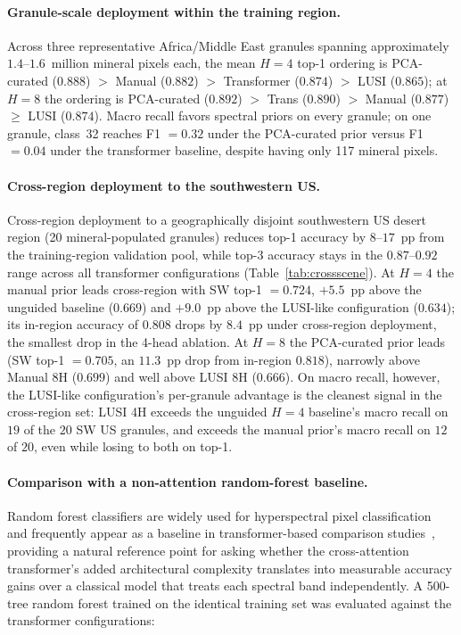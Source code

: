 \documentclass[11pt]{article}
\begin{document}
\paragraph{Granule-scale deployment within the training region.}
Across three representative Africa/Middle East granules spanning approximately $1.4$--$1.6$~million mineral pixels each, the mean $H = 4$ top-1 ordering is PCA-curated ($0.888$) $>$ Manual ($0.882$) $>$ Transformer ($0.874$) $>$ LUSI ($0.865$); at $H = 8$ the ordering is PCA-curated ($0.892$) $>$ Trans ($0.890$) $>$ Manual ($0.877$) $\geq$ LUSI ($0.874$).
Macro recall favors spectral priors on every granule; on one granule, class~32 reaches F1 $= 0.32$ under the PCA-curated prior versus F1 $= 0.04$ under the transformer baseline, despite having only 117 mineral pixels.

\paragraph{Cross-region deployment to the southwestern US.}
Cross-region deployment to a geographically disjoint southwestern US desert region (20 mineral-populated granules) reduces top-1 accuracy by $8$--$17$~pp from the training-region validation pool, while top-3 accuracy stays in the $0.87$--$0.92$ range across all transformer configurations (Table~\ref{tab:crossscene}).
At $H = 4$ the manual prior leads cross-region with SW top-1 $= 0.724$, $+5.5$~pp above the unguided baseline ($0.669$) and $+9.0$~pp above the LUSI-like configuration ($0.634$); its in-region accuracy of $0.808$ drops by $8.4$~pp under cross-region deployment, the smallest drop in the 4-head ablation.
At $H = 8$ the PCA-curated prior leads (SW top-1 $= 0.705$, an $11.3$~pp drop from in-region $0.818$), narrowly above Manual 8H ($0.699$) and well above LUSI 8H ($0.666$).
On macro recall, however, the LUSI-like configuration's per-granule advantage is the cleanest signal in the cross-region set: LUSI 4H exceeds the unguided $H = 4$ baseline's macro recall on $19$ of the $20$ SW US granules, and exceeds the manual prior's macro recall on $12$ of $20$, even while losing to both on top-1.

\paragraph{Comparison with a non-attention random-forest baseline.}
Random forest classifiers are widely used for hyperspectral pixel classification~\cite{wang2022hyspex} and frequently appear as a baseline in transformer-based comparison studies~\cite{hong2021spectralformer}, providing a natural reference point for asking whether the cross-attention transformer's added architectural complexity translates into measurable accuracy gains over a classical model that treats each spectral band independently.
A 500-tree random forest trained on the identical training set was evaluated against the transformer configurations:
\end{document}
